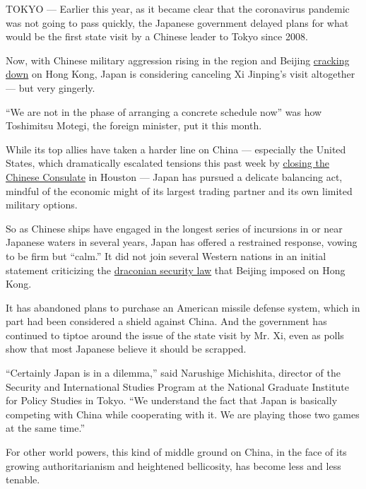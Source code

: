 TOKYO --- Earlier this year, as it became clear that the coronavirus
pandemic was not going to pass quickly, the Japanese government delayed
plans for what would be the first state visit by a Chinese leader to
Tokyo since 2008.

Now, with Chinese military aggression rising in the region and Beijing
\href{https://www.nytimes3xbfgragh.onion/2020/06/29/world/asia/china-hong-kong-security-law-rules.html}{cracking
down} on Hong Kong, Japan is considering canceling Xi Jinping's visit
altogether --- but very gingerly.

``We are not in the phase of arranging a concrete schedule now'' was how
Toshimitsu Motegi, the foreign minister, put it this month.

While its top allies have taken a harder line on China --- especially
the United States, which dramatically escalated tensions this past week
by
\href{https://www.nytimes3xbfgragh.onion/2020/07/22/world/asia/us-china-houston-consulate.html?action=click\&module=Top\%20Stories\&pgtype=Homepage}{closing
the Chinese Consulate} in Houston --- Japan has pursued a delicate
balancing act, mindful of the economic might of its largest trading
partner and its own limited military options.

So as Chinese ships have engaged in the longest series of incursions in
or near Japanese waters in several years, Japan has offered a restrained
response, vowing to be firm but ``calm.'' It did not join several
Western nations in an initial statement criticizing the
\href{https://www.nytimes3xbfgragh.onion/2020/06/29/world/asia/china-hong-kong-security-law-rules.html?searchResultPosition=6}{draconian
security law} that Beijing imposed on Hong Kong.

It has abandoned plans to purchase an American missile defense system,
which in part had been considered a shield against China. And the
government has continued to tiptoe around the issue of the state visit
by Mr. Xi, even as polls show that most Japanese believe it should be
scrapped.

``Certainly Japan is in a dilemma,'' said Narushige Michishita, director
of the Security and International Studies Program at the National
Graduate Institute for Policy Studies in Tokyo. ``We understand the fact
that Japan is basically competing with China while cooperating with it.
We are playing those two games at the same time.''

For other world powers, this kind of middle ground on China, in the face
of its growing authoritarianism and heightened bellicosity, has become
less and less tenable.

